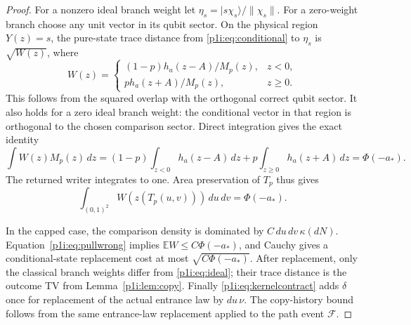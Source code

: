 \documentclass[11pt]{article}
\numberwithin{equation}{section}
\theoremstyle{definition}
\theoremstyle{remark}
\begin{document}
\begin{proof}
For a nonzero ideal branch weight let
$\eta_s=|s\chi_s\rangle/\|\chi_s\|$. For a zero-weight branch choose any
unit vector in its qubit sector. On the physical region $Y(z)=s$, the
pure-state trace distance from \eqref{p1i:eq:conditional} to $\eta_s$ is
$\sqrt{W(z)}$, where
\[
 W(z)=\begin{cases}
 (1-p)h_a(z-A)/M_p(z),&z<0,\\
 p h_a(z+A)/M_p(z),&z\geq0.
 \end{cases}
\]
This follows from the squared overlap with the orthogonal correct
qubit sector. It also holds for a zero ideal branch weight: the
conditional vector in that region is orthogonal to the chosen comparison
sector. Direct integration gives the exact identity
\begin{equation}\label{p1i:eq:wrongidentity}
 \int W(z)M_p(z)\,dz
 =(1-p)\int_{z<0}h_a(z-A)\,dz
       +p\int_{z\geq0}h_a(z+A)\,dz
 =\Phi(-a_*).
\end{equation}
The returned writer integrates to one. Area preservation of $T_p$ thus
gives
\begin{equation}\label{p1i:eq:pullwrong}
 \int_{(0,1)^2} W(z(T_p(u,v)))\,du\,dv=\Phi(-a_*).
\end{equation}

In the capped case, the comparison density is dominated by
$C\,du\,dv\,\kappa(dN)$. Equation~\eqref{p1i:eq:pullwrong} implies
$\mathbb E W\leq C\Phi(-a_*)$, and Cauchy gives a conditional-state
replacement cost at most $\sqrt{C\Phi(-a_*)}$. After replacement, only the
classical branch weights differ from \eqref{p1i:eq:ideal}; their trace
distance is the outcome TV from Lemma~\ref{p1i:lem:copy}. Finally
\eqref{p1i:eq:kernelcontract} adds $\delta$ once for replacement of the
actual entrance law by $du\,\nu$. The copy-history bound follows from the
same entrance-law replacement applied to the path event $\mathcal F$.


\end{proof}
\end{document}
